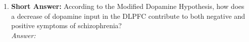 \begin{enumerate}[label=\textbf{Q4.1.\arabic*}]
    \item \textbf{Short Answer:} According to the Modified Dopamine Hypothesis, how does a decrease of dopamine input in the DLPFC contribute to both negative and positive symptoms of schizophrenia? \\
        \textit{Answer:} \\ %
\end{enumerate}
\squigglyline
\newpage
